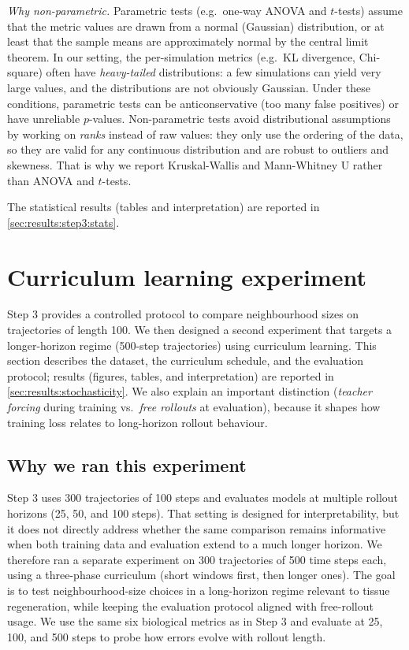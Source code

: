 \textit{Why non-parametric.}
Parametric tests (e.g.\ one-way ANOVA and \(t\)-tests) assume that the metric values are drawn from a normal (Gaussian) distribution, or at least that the sample means are approximately normal by the central limit theorem.
In our setting, the per-simulation metrics (e.g.\ KL divergence, Chi-square) often have \emph{heavy-tailed} distributions: a few simulations can yield very large values, and the distributions are not obviously Gaussian.
Under these conditions, parametric tests can be anticonservative (too many false positives) or have unreliable \(p\)-values.
Non-parametric tests avoid distributional assumptions by working on \emph{ranks} instead of raw values: they only use the ordering of the data, so they are valid for any continuous distribution and are robust to outliers and skewness.
That is why we report Kruskal-Wallis and Mann-Whitney U rather than ANOVA and \(t\)-tests.

The statistical results (tables and interpretation) are reported in \cref{sec:results:step3:stats}.

\section{Curriculum learning experiment}
\label{sec:impl:curriculum}

Step 3 provides a controlled protocol to compare neighbourhood sizes on trajectories of length 100.
We then designed a second experiment that targets a longer-horizon regime (500-step trajectories) using curriculum learning.
This section describes the dataset, the curriculum schedule, and the evaluation protocol; results (figures, tables, and interpretation) are reported in \cref{sec:results:stochasticity}.
We also explain an important distinction (\emph{teacher forcing} during training vs.\ \emph{free rollouts} at evaluation), because it shapes how training loss relates to long-horizon rollout behaviour.

\subsection{Why we ran this experiment}
\label{sec:impl:curriculum:rationale}

Step 3 uses 300 trajectories of 100 steps and evaluates models at multiple rollout horizons (25, 50, and 100 steps).
That setting is designed for interpretability, but it does not directly address whether the same comparison remains informative when both training data and evaluation extend to a much longer horizon.
We therefore ran a separate experiment on 300 trajectories of 500 time steps each, using a three-phase curriculum (short windows first, then longer ones).
The goal is to test neighbourhood-size choices in a long-horizon regime relevant to tissue regeneration, while keeping the evaluation protocol aligned with free-rollout usage.
We use the same six biological metrics as in Step 3 and evaluate at 25, 100, and 500 steps to probe how errors evolve with rollout length.

